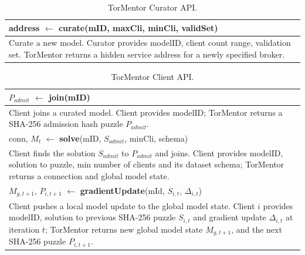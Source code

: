 
\begin{table}[h]
\begin{tabular}{p{\textwidth}}
 \hline \hline
 address $\leftarrow$ \textbf{curate}(mID, maxCli, minCli, validSet) \\
 \hline
 Curate a new model. Curator provides modelID,  
 client count range, validation set. TorMentor returns a hidden
 service address for a newly specified broker. \\
 \hline
\end{tabular} 
\caption{TorMentor Curator API.\label{tab:CurAPI} }
\end{table}

\begin{table}[h]
\begin{tabular}{p{\textwidth}}
 \hline \hline
 $P_{admit}$ $\leftarrow$ \textbf{join}(mID) \\
 \hline
 Client joins a curated model. Client provides modelID; TorMentor returns
 a SHA-256 admission hash puzzle $P_{admit}$.                          
 \\
 \hline \hline
 conn, $M_t$ $\leftarrow$ \textbf{solve}(mID, $S_{admit}$, minCli, schema) \\
 \hline
 Client finds the solution $S_{admit}$ to $P_{admit}$ and joins. Client
 provides modelID, solution to puzzle, min number of clients and its
 dataset schema; TorMentor returns a connection and global model state.
 \\
 \hline \hline
 $M_{g,t+1}$, $P_{i,t+1}$ $\leftarrow$ \textbf{gradientUpdate}(mId, $S_
 {i,t}$, $\Delta_{i,t}$) \\
 \hline
 Client pushes a local model update to the global model state. Client $i$
 provides modelID, solution to previous SHA-256 puzzle $S_{i,t}$ and
 gradient update $\Delta_{i,t}$ at iteration $t$; TorMentor returns new
 global model state $M_{g,t+1}$, and the next SHA-256 puzzle $P_
 {i,t+1}$. \\
 \hline
\end{tabular} 
\caption{TorMentor Client API.\label{tab:CliAPI} }
\end{table}

